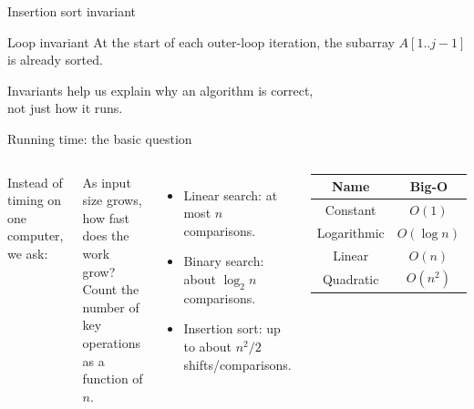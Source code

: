 \documentclass[aspectratio=43,10pt]{beamer}
\begin{document}
\begin{frame}{Insertion sort invariant}
  \begin{block}{Loop invariant}
  At the start of each outer-loop iteration, the subarray $A[1..j-1]$ is already sorted.
  \end{block}

  \vspace{0.6em}
  \begin{center}
  \end{center}

  \vspace{0.5em}
  Invariants help us explain why an algorithm is correct,\\not just how it runs.
\end{frame}

\begin{frame}{Running time: the basic question}
  \begin{columns}[T]
      Instead of timing on one computer, we ask:
      \begin{block}{As input size grows, how fast does the work grow?}
      Count the number of key operations as a function of $n$.
      \end{block}
      \begin{itemize}
        \item Linear search: at most $n$ comparisons.
        \item Binary search: about $\log_2 n$ comparisons.
        \item Insertion sort: up to about $n^2/2$ shifts/comparisons.
      \end{itemize}
      \begin{center}
      \begin{tabular}{cc}
        \toprule
        Name & Big-O \\
        \midrule
        Constant & $O(1)$ \\
        Logarithmic & $O(\log n)$ \\
        Linear & $O(n)$ \\
        Quadratic & $O(n^2)$ \\
        \bottomrule
      \end{tabular}
      \end{center}
  \end{columns}
\end{frame}
\end{document}
